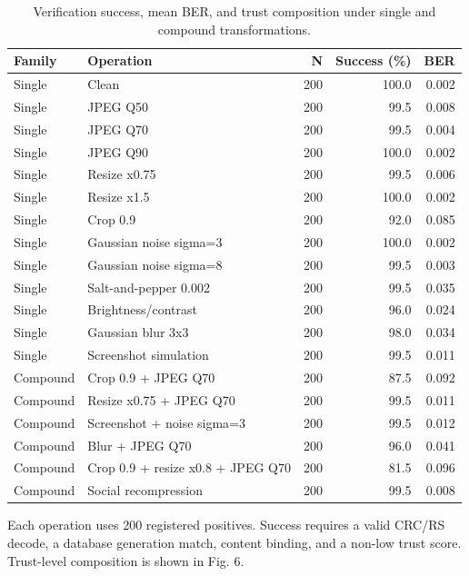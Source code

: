 \begin{table}[t]
\centering
\caption{Verification success, mean BER, and trust composition under single and compound transformations.}
\label{tab:robustness}
\begin{tabular}{l l r r r}
\toprule
Family & Operation & N & Success (\%) & BER \\
\midrule
Single & Clean & 200 & 100.0 & 0.002 \\
Single & JPEG Q50 & 200 & 99.5 & 0.008 \\
Single & JPEG Q70 & 200 & 99.5 & 0.004 \\
Single & JPEG Q90 & 200 & 100.0 & 0.002 \\
Single & Resize x0.75 & 200 & 99.5 & 0.006 \\
Single & Resize x1.5 & 200 & 100.0 & 0.002 \\
Single & Crop 0.9 & 200 & 92.0 & 0.085 \\
Single & Gaussian noise sigma=3 & 200 & 100.0 & 0.002 \\
Single & Gaussian noise sigma=8 & 200 & 99.5 & 0.003 \\
Single & Salt-and-pepper 0.002 & 200 & 99.5 & 0.035 \\
Single & Brightness/contrast & 200 & 96.0 & 0.024 \\
Single & Gaussian blur 3x3 & 200 & 98.0 & 0.034 \\
Single & Screenshot simulation & 200 & 99.5 & 0.011 \\
Compound & Crop 0.9 + JPEG Q70 & 200 & 87.5 & 0.092 \\
Compound & Resize x0.75 + JPEG Q70 & 200 & 99.5 & 0.011 \\
Compound & Screenshot + noise sigma=3 & 200 & 99.5 & 0.012 \\
Compound & Blur + JPEG Q70 & 200 & 96.0 & 0.041 \\
Compound & Crop 0.9 + resize x0.8 + JPEG Q70 & 200 & 81.5 & 0.096 \\
Compound & Social recompression & 200 & 99.5 & 0.008 \\
\bottomrule
\end{tabular}
\par\smallskip
\footnotesize Each operation uses 200 registered positives. Success requires a valid CRC/RS decode, a database generation match, content binding, and a non-low trust score. Trust-level composition is shown in Fig. 6.
\end{table}

